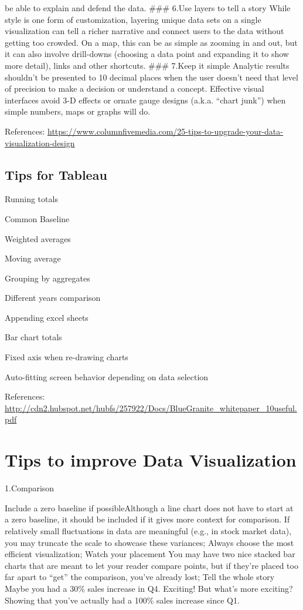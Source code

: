 \documentclass[]{book}
\theoremstyle{definition}
\theoremstyle{definition}
\theoremstyle{definition}
\theoremstyle{remark}
\begin{document}
be able to explain and defend the data. \#\#\# 6.Use layers to tell a
story While style is one form of customization, layering unique data
sets on a single visualization can tell a richer narrative and connect
users to the data without getting too crowded. On a map, this can be as
simple as zooming in and out, but it can also involve drill-downs
(choosing a data point and expanding it to show more detail), links and
other shortcuts. \#\#\# 7.Keep it simple Analytic results shouldn't be
presented to 10 decimal places when the user doesn't need that level of
precision to make a decision or understand a concept. Effective visual
interfaces avoid 3-D effects or ornate gauge designs (a.k.a. ``chart
junk'') when simple numbers, maps or graphs will do.

References:
\url{https://www.columnfivemedia.com/25-tips-to-upgrade-your-data-visualization-design}

\section{Tips for Tableau}\label{tips-for-tableau}

Running totals

Common Baseline

Weighted averages

Moving average

Grouping by aggregates

Different years comparison

Appending excel sheets

Bar chart totals

Fixed axis when re-drawing charts

Auto-fitting screen behavior depending on data selection

References:
\url{http://cdn2.hubspot.net/hubfs/257922/Docs/BlueGranite_whitepaper_10useful.pdf}

\chapter{Tips to improve Data
Visualization}\label{tips-to-improve-data-visualization-1}

1.Comparison

Include a zero baseline if possibleAlthough a line chart does not have
to start at a zero baseline, it should be included if it gives more
context for comparison. If relatively small fluctuations in data are
meaningful (e.g., in stock market data), you may truncate the scale to
showcase these variances; Always choose the most efficient
visualization; Watch your placement You may have two nice stacked bar
charts that are meant to let your reader compare points, but if they're
placed too far apart to ``get'' the comparison, you've already lost;
Tell the whole story Maybe you had a 30\% sales increase in Q4.
Exciting! But what's more exciting? Showing that you've actually had a
100\% sales increase since Q1.
\end{document}
